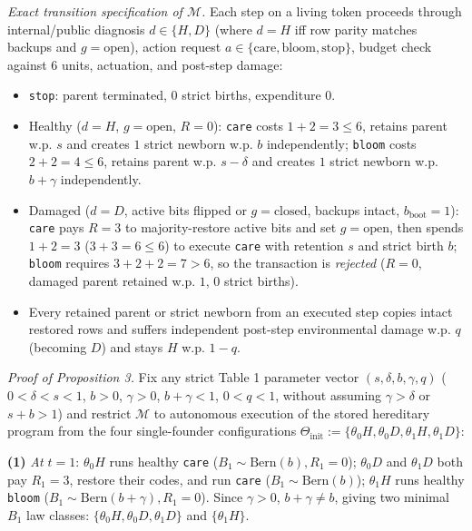 \documentclass[11pt,letterpaper]{article}
\providecommand{\tightlist}{\setlength{\itemsep}{2pt}\setlength{\parskip}{0pt}}
\begin{document}
\emph{Exact transition specification of \(\mathcal{M}\).} Each step on a
living token proceeds through internal/public diagnosis
\(d \in \{H, D\}\) (where \(d = H\) iff row parity matches backups and
\(g = \mathrm{open}\)), action request
\(a \in \{\mathrm{care}, \mathrm{bloom}, \mathrm{stop}\}\), budget check
against \(6\) units, actuation, and post-step damage:

\begin{itemize}
\tightlist
\item
  \texttt{stop}: parent terminated, \(0\) strict births, expenditure
  \(0\).
\item
  Healthy (\(d = H\), \(g = \mathrm{open}\), \(R = 0\)): \texttt{care}
  costs \(1 + 2 = 3 \le 6\), retains parent w.p. \(s\) and creates \(1\)
  strict newborn w.p. \(b\) independently; \texttt{bloom} costs
  \(2 + 2 = 4 \le 6\), retains parent w.p. \(s - \delta\) and creates
  \(1\) strict newborn w.p. \(b + \gamma\) independently.
\item
  Damaged (\(d = D\), active bits flipped or \(g = \mathrm{closed}\),
  backups intact, \(b_{\mathrm{boot}} = 1\)): \texttt{care} pays
  \(R = 3\) to majority-restore active bits and set
  \(g = \mathrm{open}\), then spends \(1 + 2 = 3\) (\(3+3=6 \le 6\)) to
  execute \texttt{care} with retention \(s\) and strict birth \(b\);
  \texttt{bloom} requires \(3 + 2 + 2 = 7 > 6\), so the transaction is
  \emph{rejected} (\(R = 0\), damaged parent retained w.p. \(1\), \(0\)
  strict births).
\item
  Every retained parent or strict newborn from an executed step copies
  intact restored rows and suffers independent post-step environmental
  damage w.p. \(q\) (becoming \(D\)) and stays \(H\) w.p. \(1-q\).
\end{itemize}

\emph{Proof of Proposition 3.} Fix any strict Table 1 parameter vector
\((s,\delta,b,\gamma,q)\) (\(0 < \delta < s < 1\), \(b > 0\),
\(\gamma > 0\), \(b+\gamma < 1\), \(0 < q < 1\), without assuming
\(\gamma > \delta\) or \(s+b > 1\)) and restrict \(\mathcal{M}\) to
autonomous execution of the stored hereditary program from the four
single-founder configurations
\(\Theta_{\mathrm{init}} := \{\theta_0 H, \theta_0 D, \theta_1 H, \theta_1 D\}\):

\textbf{(1)} \emph{At \(t=1\)}: \(\theta_0 H\) runs healthy
\texttt{care} (\(B_1 \sim \mathrm{Bern}(b), R_1 = 0\)); \(\theta_0 D\)
and \(\theta_1 D\) both pay \(R_1 = 3\), restore their codes, and run
\texttt{care} (\(B_1 \sim \mathrm{Bern}(b)\)); \(\theta_1 H\) runs
healthy \texttt{bloom} (\(B_1 \sim \mathrm{Bern}(b+\gamma), R_1 = 0\)).
Since \(\gamma > 0\), \(b + \gamma \neq b\), giving two minimal \(B_1\)
law classes: \(\{\theta_0 H, \theta_0 D, \theta_1 D\}\) and
\(\{\theta_1 H\}\).
\end{document}
